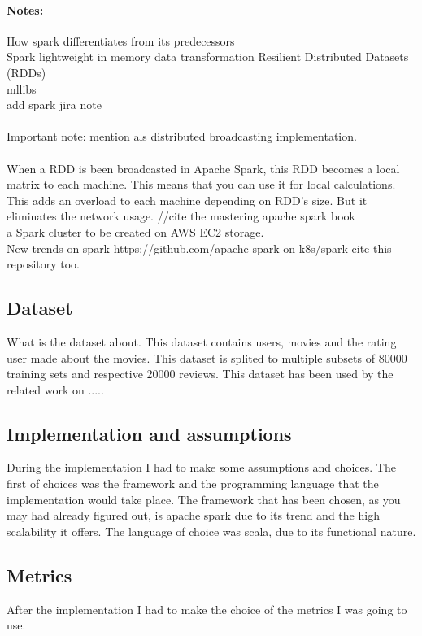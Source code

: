 \paragraph{Notes:}
How spark differentiates from its predecessors\\
Spark lightweight in memory data transformation 
Resilient Distributed Datasets (RDDs) \\
mllibs\\
add spark jira note \\\\
Important note: mention als distributed broadcasting implementation. 
\\\\
When a RDD is been broadcasted in Apache Spark, this RDD becomes a local matrix to each machine. This means that you can use it for local calculations. This adds an overload to each machine depending on RDD's size. But it eliminates the network usage.
//cite the mastering apache spark book
\cite{ApacheSpark:1} \\
a Spark cluster to be created on AWS EC2 storage.\\
New trends on spark https://github.com/apache-spark-on-k8s/spark cite this repository too.
\subsection{Dataset}
What is the dataset about. This dataset contains users, movies and the rating user made about the movies.
This dataset is splited to multiple subsets of 80000 training sets and respective 20000 reviews.
This dataset has been used by the related work on .....
\cite{MovieLens:3}

\subsection{Implementation and assumptions}
During the implementation I had to make some assumptions and choices. The first of choices was the framework and the programming language that the implementation would take place. The framework that has been chosen, as you may had already figured out, is apache spark due to its trend and the high scalability it offers. The language of choice was scala, due to its functional nature.
\subsection{Metrics}
After the implementation I had to make the choice of the metrics I was going to use.
